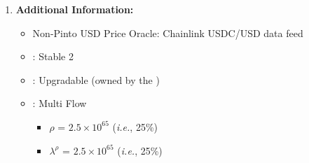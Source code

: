 \documentclass[class=article, crop=false]{standalone}
\begin{document}
\begin{enumerate}
    \item \textbf{Additional Information:}
        \begin{itemize}
            \item Non-Pinto USD Price Oracle: Chainlink USDC/USD data feed
            \item {}: Stable 2
            \item {}: Upgradable  (owned by the )
            \item {}: Multi Flow
                \begin{itemize}
                    \item $\rho$ = $2.5 \times 10^{65}$ (\textit{i.e.}, 25\%)
                    \item $\lambda^{\rho}$ = $2.5 \times 10^{65}$ (\textit{i.e.}, 25\%)
                \end{itemize}
        \end{itemize}

\end{enumerate}
\end{document}
